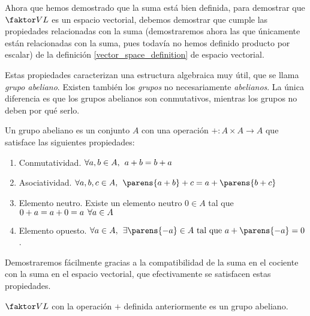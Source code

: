 \documentclass[../algebra_lineal.tex]{subfiles}
\begin{document}
Ahora que hemos demostrado que la suma está bien definida, para demostrar que $\qs{V}{L}$ es un espacio vectorial, debemos demostrar que cumple las propiedades relacionadas con la suma (demostraremos ahora las que únicamente están relacionadas con la suma, pues todavía no hemos definido producto por escalar) de la definición \ref{vector_space_definition} de espacio vectorial. 

Estas propiedades caracterizan una estructura algebraica muy útil, que se llama \textit{grupo abeliano}. Existen también los \textit{grupos} no necesariamente \textit{abelianos}. La única diferencia es que los grupos abelianos son conmutativos, mientras los grupos no deben por qué serlo.

\begin{definition}
    \label{definicion_grupo_abeliano}
    Un grupo abeliano es un conjunto $A$ con una operación  $+ : A \times A \to A$ que satisface las siguientes propiedades:
    \begin{enumerate}
        \item Conmutatividad. $\forall a, b \in A, \hspace{1.5mm} a + b = b + a$
        \item Asociatividad. $\forall a, b, c \in A, \spc \parens{a + b} + c = a + \parens{b+c}$
        \item Elemento neutro. Existe un elemento neutro $0 \in A$ tal que $0 + a = a + 0 = a \hspace{1.5mm} \forall a \in A $
        \item Elemento opuesto. $\forall a \in A, \spc \exists \parens{-a} \in A \st a + \parens{-a} = 0$.
    \end{enumerate}
\end{definition}

Demostraremos fácilmente gracias a la compatibilidad de la suma en el cociente con la suma en el espacio vectorial, que efectivamente se satisfacen estas propiedades.

\begin{proposition}
    \label{proposicion_cociente_grupo_abeliano}
    $\qs{V}{L}$ con la operación $+$ definida anteriormente es un grupo abeliano.
\end{proposition}
\end{document}
